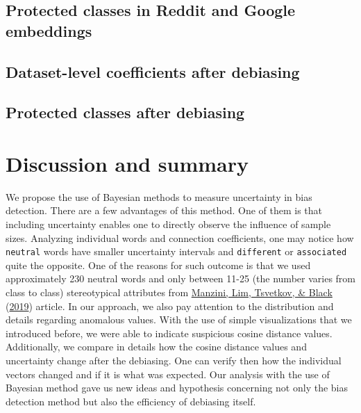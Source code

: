 \documentclass[
  12pt,
]{book}
\begin{document}
\hypertarget{protected-classes-in-reddit-and-google-embeddings}{%
\section{Protected classes in Reddit and Google embeddings}\label{protected-classes-in-reddit-and-google-embeddings}}

\hypertarget{dataset-level-coefficients-after-debiasing}{%
\section{Dataset-level coefficients after debiasing}\label{dataset-level-coefficients-after-debiasing}}

\hypertarget{protected-classes-after-debiasing}{%
\section{Protected classes after debiasing}\label{protected-classes-after-debiasing}}

\hypertarget{discussion-and-summary}{%
\chapter{Discussion and summary}\label{discussion-and-summary}}

We propose the use of Bayesian methods to measure uncertainty in bias detection. There are a few advantages of this method. One of them is that including uncertainty enables one to directly observe the influence of sample sizes. Analyzing individual words and connection coefficients, one may notice how \texttt{neutral} words have smaller uncertainty intervals and \texttt{different} or \texttt{associated} quite the opposite. One of the reasons for such outcome is that we used approximately 230 neutral words and only between 11-25 (the number varies from class to class) stereotypical attributes from \protect\hyperlink{ref-Manzini2019blackToCriminal}{Manzini, Lim, Tsvetkov, \& Black} (\protect\hyperlink{ref-Manzini2019blackToCriminal}{2019}) article. In our approach, we also pay attention to the distribution and details regarding anomalous values. With the use of simple visualizations that we introduced before, we were able to indicate suspicious cosine distance values. Additionally, we compare in details how the cosine distance values and uncertainty change after the debiasing. One can verify then how the individual vectors changed and if it is what was expected. Our analysis with the use of Bayesian method gave us new ideas and hypothesis concerning not only the bias detection method but also the efficiency of debiasing itself.
\end{document}
